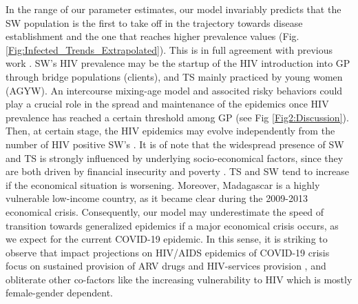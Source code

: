 \documentclass[preprint,12pt]{elsarticle}
\begin{document}
In the range of our parameter estimates, our model invariably predicts that the SW population is the first to take off in the trajectory towards disease establishment and the one that reaches higher prevalence values (Fig. \ref{Fig:Infected_Trends_Extrapolated}). This is in full agreement with previous work \cite{Bershteyn2013}. SW’s HIV prevalence may be the startup of the HIV introduction into GP through bridge populations (clients), and TS mainly practiced by young women (AGYW). An intercourse mixing-age model and associted risky behaviors could play a crucial role in the spread and maintenance of the epidemics once HIV prevalence has reached a certain threshold among GP (see Fig \ref{Fig2:Discussion}). Then, at certain stage, the HIV epidemics may evolve independently from the number of HIV positive SW's \cite{Bershteyn2013}. It is of note that the widespread presence of SW and TS is strongly influenced by underlying socio-economical factors, since they are both driven by financial insecurity and poverty \cite{Ingabire2012,Fitzgerald-Husek2011}. TS and SW tend to increase if the economical situation is worsening. Moreover, Madagascar is a highly vulnerable low-income country, as it became clear during the 2009-2013 economical crisis. Consequently, our model may underestimate the speed of transition towards generalized epidemics if a major economical crisis occurs, as we expect for the current COVID-19 epidemic. In this sense, it is striking to observe that impact projections on HIV/AIDS epidemics of COVID-19 crisis focus on sustained provision of ARV drugs and HIV-services provision \cite{Jewell2020}, and obliterate other co-factors like the increasing vulnerability to HIV which is mostly female-gender dependent.
\smallskip

\smallskip
\end{document}
